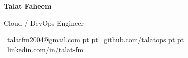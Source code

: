 \documentclass[10pt, letterpaper]{article}
\newenvironment{header}{
    \setlength{\topsep}{0pt}\par\kern\topsep\centering\linespread{1.5}
}{
    \par\kern\topsep
}
\let\hrefWithoutArrow\href
\begin{document}
\begin{header}
    \fontsize{28 pt}{28 pt}\selectfont \textbf{\textcolor{primaryColor}{Talat Faheem}}

    \vspace{4 pt}
    \fontsize{14 pt}{14 pt}\selectfont \textcolor{primaryColor}{Cloud / DevOps Engineer}

    \vspace{8 pt}

    \normalsize
    \mbox{\faEnvelope\ \hrefWithoutArrow{mailto:talatfm2004@gmail.com}{talatfm2004@gmail.com}}%
     pt%
    \AND%
     pt%
    \mbox{\faGithub\ \hrefWithoutArrow{https://github.com/talatops}{github.com/talatops}}%
     pt%
    \AND%
     pt%
    \mbox{\faLinkedin\ \hrefWithoutArrow{https://www.linkedin.com/in/talat-fm/}{linkedin.com/in/talat-fm}}%
\end{header}

\vspace{5 pt - 0.3 cm}


\end{document}
